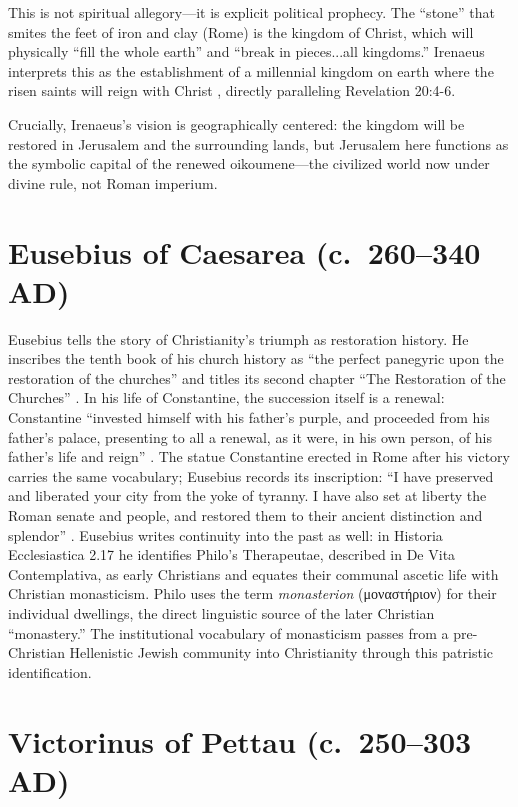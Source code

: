 This is not spiritual allegory---it is explicit political prophecy.
The ``stone'' that smites the feet of iron and clay (Rome) is the kingdom of Christ, which will physically ``fill the whole earth'' and ``break in pieces...all kingdoms.''
Irenaeus interprets this as the establishment of a millennial kingdom on earth where the risen saints will reign with Christ \cite[5.32.1--5.35.2]{irenaeus:advhaer}, directly paralleling Revelation 20:4-6.

Crucially, Irenaeus's vision is geographically centered: the kingdom will be restored in Jerusalem and the surrounding lands, but Jerusalem here functions as the symbolic capital of the renewed oikoumene---the civilized world now under divine rule, not Roman imperium.

\section{Eusebius of Caesarea (c.~260--340 AD)}\label{sec:eusebius-of-caesarea-c.-260340-ad}

Eusebius tells the story of Christianity's triumph as restoration history.
He inscribes the tenth book of his church history as ``the perfect panegyric upon the restoration of the churches'' and titles its second chapter ``The Restoration of the Churches'' \cite[10.1--10.2]{eusebius:he}.
In his life of Constantine, the succession itself is a renewal: Constantine ``invested himself with his father's purple, and proceeded from his father's palace, presenting to all a renewal, as it were, in his own person, of his father's life and reign'' \cite[1.22]{eusebius:vita}.
The statue Constantine erected in Rome after his victory carries the same vocabulary; Eusebius records its inscription: ``I have preserved and liberated your city from the yoke of tyranny. I have also set at liberty the Roman senate and people, and restored them to their ancient distinction and splendor'' \cite[1.40]{eusebius:vita}.
Eusebius writes continuity into the past as well: in Historia Ecclesiastica 2.17 he identifies Philo's Therapeutae, described in De Vita Contemplativa, as early Christians and equates their communal ascetic life with Christian monasticism.
Philo uses the term \emph{monasterion} (μοναστήριον) for their individual dwellings, the direct linguistic source of the later Christian ``monastery.''
The institutional vocabulary of monasticism passes from a pre-Christian Hellenistic Jewish community into Christianity through this patristic identification.

\section{Victorinus of Pettau (c.~250--303 AD)}\label{sec:victorinus-of-pettau-c.-250303-ad}

